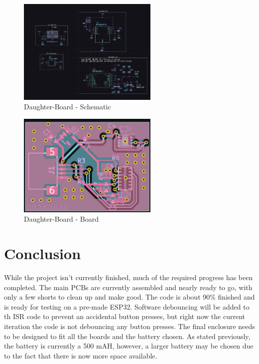 \documentclass[12pt]{article}
\begin{document}
    \begin{figure}[ht]
        \centering
        \includegraphics[width=0.6\textwidth]{images/mb_schematic.png}
        \caption{Daughter-Board - Schematic}
        \label{db_schem}
    \end{figure}

    \begin{figure}[ht]
        \centering
        \includegraphics[width=0.6\textwidth]{images/mb_board.png}
        \caption{Daughter-Board - Board}
        \label{db_board}
    \end{figure}

\section{Conclusion}
    While the project isn't currently finished, much of the required progress has been completed. The main PCBs are currently assembled and nearly ready to go, with only a few shorts to clean up and make good. The code is about 90\% finished and is ready for testing on a pre-made ESP32. Software debouncing will be added to th ISR code to prevent an accidental button presses, but right now the current iteration the code is not debouncing any button presses. The final enclosure needs to be designed to fit all the boards and the battery chosen. As stated previously, the battery is currently a 500 mAH, however, a larger battery may be chosen due to the fact that there is now more space available.
\end{document}
